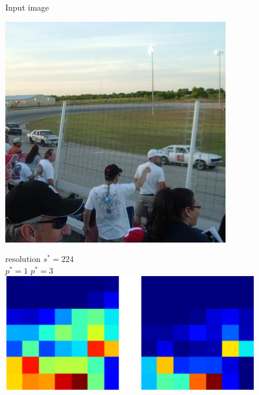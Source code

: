 %

%
%

%
%
%
%

%

%


\begin{figure}
%
{\small
\begin{minipage}{0.47\columnwidth}
\centering 
Input image \medskip

\includegraphics[width=\columnwidth]{figs/per_channel_maps/2/pos.jpg} 

\end{minipage}%
\hfill
%
\begin{minipage}{0.5\columnwidth}
\centering
resolution $s^*=224$ \\

$p^* = 1$ \hspace{1cm} $p^* = 3$ \\

\includegraphics[width=0.8\columnwidth]{figs/per_channel_maps/2/activ_224.pdf}


\end{minipage}}
\end{figure}
